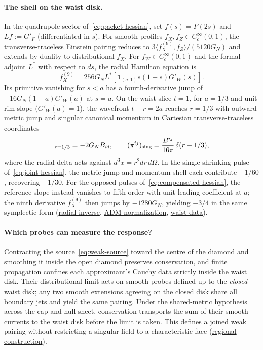 \documentclass[10pt,a4paper]{article}
\numberwithin{equation}{section}
\newcommand{\repo}[2]{\href{https://github.com/sprajs/quantum-gravity/blob/main/#1}{#2}}
\begin{document}
\paragraph{The shell on the waist disk.}
In the quadrupole sector of~\eqref{eq:packet-hessian}, set $f(s)=F(2s)$ and $Lf:=G'_F$ (differentiated in $s$). For smooth profiles $f_X,f_Z\in C_c^\infty(0,1)$, the transverse-traceless Einstein pairing reduces to $3\langle f_X^{(9)},f_Z\rangle/(5120 G_N)$ and extends by duality to distributional $f_X$. For $f_W\in C_c^\infty(0,1)$ and the formal adjoint $L^*$ with respect to $ds$, the radial Hamilton equation is
\begin{equation}
 f_X^{(9)}=256G_N L^*\!\left[\mathbf1_{(a,1)}s(1-s)G'_W(s)\right].
 \label{eq:weak-master}
\end{equation}
Its primitive vanishing for $s<a$ has a fourth-derivative jump of $-16G_N(1-a)G'_W(a)$ at $s=a$. On the waist slice $t=1$, for $a=1/3$ and unit rim slope ($G'_W(a)=1$), the wavefront $t-r=2a$ reaches $r=1/3$ with outward metric jump and singular canonical momentum in Cartesian transverse-traceless coordinates
\begin{equation}
 [h_{ij}]_{r=1/3}=-2G_N B_{ij},\qquad
 (\pi^{ij})_{\rm sing}=\frac{B^{ij}}{16\pi}\,\delta(r-1/3),
 \label{eq:weak-shell}
\end{equation}
where the radial delta acts against $d^3x=r^2dr\,d\Omega$. In the single shrinking pulse of~\eqref{eq:joint-hessian}, the metric jump and momentum shell each contribute $-1/60$, recovering $-1/30$. For the opposed pulses of~\eqref{eq:compensated-hessian}, the reference slope instead vanishes to fifth order with unit leading coefficient at $a$; the ninth derivative $f_X^{(9)}$ then jumps by $-1280 G_N$, yielding $-3/4$ in the same symplectic form (\repo{audit/weak-master.md}{radial inverse}, \repo{audit/weak-normalization.md}{ADM normalization}, \repo{audit/weak-cauchy.md}{waist data}).

\paragraph{Which probes can measure the response?}
Contracting the source~\eqref{eq:weak-source} toward the centre of the diamond and smoothing it inside the open diamond preserves conservation, and finite propagation confines each approximant's Cauchy data strictly inside the waist disk. Their distributional limit acts on smooth probes defined up to the \emph{closed} waist disk; any two smooth extensions agreeing on the closed disk share all boundary jets and yield the same pairing. Under the shared-metric hypothesis across the cap and null sheet, conservation transports the sum of their smooth currents to the waist disk before the limit is taken. This defines a joined weak pairing without restricting a singular field to a characteristic face (\repo{audit/weak-boundary.md}{regional construction}).
\end{document}
